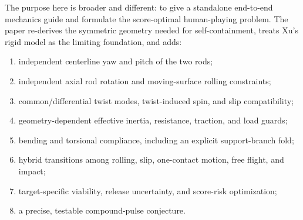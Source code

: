 \documentclass[11pt]{article}
\numberwithin{equation}{section}
\theoremstyle{definition}
\theoremstyle{remark}
\begin{document}
The purpose here is broader and different: to give a standalone end-to-end mechanics guide and formulate the score-optimal human-playing problem.  The paper re-derives the symmetric geometry needed for self-containment, treats Xu's rigid model as the limiting foundation, and adds:
\begin{enumerate}[label=(\roman*),leftmargin=2.2em]
  \item independent centerline yaw and pitch of the two rods;
  \item independent axial rod rotation and moving-surface rolling constraints;
  \item common/differential twist modes, twist-induced spin, and slip compatibility;
  \item geometry-dependent effective inertia, resistance, traction, and load guards;
  \item bending and torsional compliance, including an explicit support-branch fold;
  \item hybrid transitions among rolling, slip, one-contact motion, free flight, and impact;
  \item target-specific viability, release uncertainty, and score-risk optimization;
  \item a precise, testable compound-pulse conjecture.
\end{enumerate}
\end{document}
